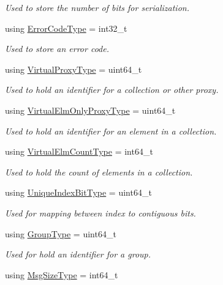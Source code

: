 \begin{DoxyCompactItemize}
\begin{DoxyCompactList}\small\item\em Used to store the number of bits for serialization. \end{DoxyCompactList}\item 
using \hyperlink{namespacevt_a793764d753923abc3d32929870beb485}{Error\+Code\+Type} = int32\+\_\+t
\begin{DoxyCompactList}\small\item\em Used to store an error code. \end{DoxyCompactList}\item 
using \hyperlink{namespacevt_a1b417dd5d684f045bb58a0ede70045ac}{Virtual\+Proxy\+Type} = uint64\+\_\+t
\begin{DoxyCompactList}\small\item\em Used to hold an identifier for a collection or other proxy. \end{DoxyCompactList}\item 
using \hyperlink{namespacevt_aa68633cd16822ae31c1cf521f817a23e}{Virtual\+Elm\+Only\+Proxy\+Type} = uint64\+\_\+t
\begin{DoxyCompactList}\small\item\em Used to hold an identifier for an element in a collection. \end{DoxyCompactList}\item 
using \hyperlink{namespacevt_ac115668758184050beff7a9281a2c490}{Virtual\+Elm\+Count\+Type} = int64\+\_\+t
\begin{DoxyCompactList}\small\item\em Used to hold the count of elements in a collection. \end{DoxyCompactList}\item 
using \hyperlink{namespacevt_a913e1f07b5228dd8bb64040dc6dcea14}{Unique\+Index\+Bit\+Type} = uint64\+\_\+t
\begin{DoxyCompactList}\small\item\em Used for mapping between index to contiguous bits. \end{DoxyCompactList}\item 
using \hyperlink{namespacevt_a27b5e4411c9b6140c49100e050e2f743}{Group\+Type} = uint64\+\_\+t
\begin{DoxyCompactList}\small\item\em Used for hold an identifier for a group. \end{DoxyCompactList}\item 
using \hyperlink{namespacevt_a408e86a8c7c89309b52907dc5a513924}{Msg\+Size\+Type} = int64\+\_\+t

\end{DoxyCompactItemize}
